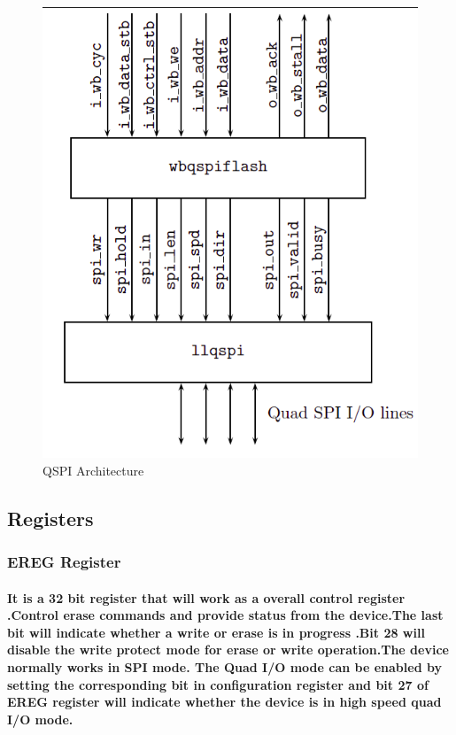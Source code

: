 \documentclass[12pt,a4paper]{report}
\begin{document}
\begin{figure}[h]
	\centering
	\includegraphics[scale=.4]{qspi.png}
	\caption{QSPI Architecture}
	\label{fig:qspi}
\end{figure}
\subsection{Registers}
\subsubsection{EREG Register }

\paragraph{\textrm{\textmd{It is a 32 bit register that will work as a overall control register .Control erase commands and provide status from the device.The last bit will indicate whether a write or erase is in progress .Bit 28 will disable the write protect mode for erase or write operation.The device normally works in SPI mode. The Quad I/O mode can be enabled by setting the corresponding bit in configuration register and bit 27 of EREG register will indicate whether the device is in high speed quad I/O mode.}}}
\end{document}
